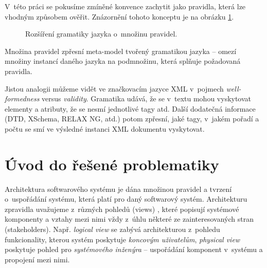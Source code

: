 V~této práci se pokusíme zmíněné konvence zachytit jako pravidla, která lze vhodným způsobem ověřit. Znázornění tohoto konceptu je na obrázku \ref{work_scope}.
\begin{figure}[h!]
  \centering
  \caption{Rozšíření gramatiky jazyka o~množinu pravidel.\label{work_scope}}
\end{figure}
Množina pravidel zpřesní meta-model tvořený gramatikou jazyka -- omezí množiny instancí daného jazyka na podmnožinu, která splňuje požadovaná pravidla.

Jistou analogii můžeme vidět ve značkovacím jazyce XML v~pojmech \emph{well-formedness} versus \emph{validity}. Gramatika udává, že se v~textu mohou vyskytovat elementy a atributy, že se nesmí  jednotlivé tagy atd. Další dodatečná informace (DTD, XSchema, RELAX NG, atd.) potom zpřesní, jaké tagy, v~jakém pořadí a počtu se smí ve výsledné instanci XML dokumentu vyskytovat.

\section{Úvod do řešené problematiky}

Architektura softwarového systému \cite{wiki:software_architecture} je dána množinou pravidel a tvrzení o~uspořádání systému, která platí pro daný softwarový systém. Architekturu zpravidla uvažujeme z~různých pohledů (views) \cite{wiki:four_plus_one_views}, které popisují systémové komponenty a vztahy mezi nimi vždy z~úhlu některé ze zainteresovaných stran (stakeholders). Např. \emph{logical view} se zabývá architekturou z~pohledu funkcionality, kterou systém poskytuje \emph{koncovým uživatelům}, \emph{physical view} poskytuje pohled pro \emph{systémového inženýra} -- uspořádání komponent v~systému a propojení mezi nimi.

